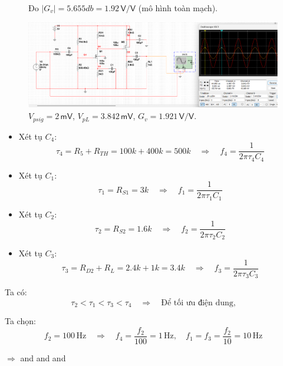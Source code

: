 \begin{itemize}[label=-]
\begin{figure}[H]
		\caption{Đo $|G_{v}| = 5.655 db = 1.92 \,\textsf{V/V}$ (mô hình toàn mạch).}
	\end{figure}
\end{itemize}


\begin{figure}[H]
	\centering
	\includegraphics[width=\linewidth]{./my-chapters/my-images/Question8/c_test.png}
	\caption{$V_{psig} = 2\,\textsf{mV}$, $V_{pL} = 3.842 \,\textsf{mV}$, $G_{v} = 1.921 \,\textsf{V/V}$.}
\end{figure}


\begin{itemize}[label=-]
	\item Xét tụ $C_4$: 
	\[
	\tau_4 = R_5 + R_{TH} = 100k + 400k = 500k 
	\quad\Rightarrow\quad 
	f_4 = \frac{1}{2\pi\tau_4 C_4}
	\]
	\item Xét tụ $C_1$: 
	\[
	\tau_1 = R_{S1} = 3k 
	\quad\Rightarrow\quad 
	f_1 = \frac{1}{2\pi\tau_1 C_1}
	\]
	\item Xét tụ $C_2$: 
	\[
	\tau_2 = R_{S2} = 1.6k 
	\quad\Rightarrow\quad 
	f_2 = \frac{1}{2\pi\tau_2 C_2}
	\]
	\item Xét tụ $C_3$: 
	\[
	\tau_3 = R_{D2} + R_L = 2.4k + 1k = 3.4k 
	\quad\Rightarrow\quad 
	f_3 = \frac{1}{2\pi\tau_3 C_3}
	\]
\end{itemize}

\noindent Ta có: 
\[
\tau_2 < \tau_1 < \tau_3 < \tau_4 
\quad\Rightarrow\quad 
\text{Để tối ưu điện dung,}
\]

\noindent Ta chọn:
\[
f_2 = 100\,\text{Hz} 
\quad\Rightarrow\quad 
f_4 = \frac{f_2}{100} = 1\,\text{Hz}, 
\quad 
f_1 = f_3 = \frac{f_2}{10} = 10\,\text{Hz}
\]

$\Rightarrow$
 and 
 and
 and  


